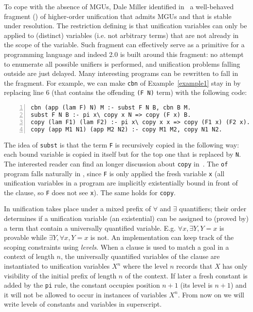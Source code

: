 \documentclass{llncs}
\begin{document}
To cope with the absence of MGUs, Dale Miller identified
in~\cite{Miller91alogic} a well-behaved fragment (\Ll{}) of higher-order
unification that admits MGUs and that is stable under \lp{} resolution. 
The restriction defining \Ll{} is that unification variables can
only be applied to (distinct) variables (i.e. not arbitrary terms) that are
not already in the scope of the variable.
Such fragment can effectively serve as a primitive for a
programming language and indeed \tedius{} 2.0 is built around this fragment:
no attempt to enumerate all possible unifiers is performed, and unification
problems falling outside \Ll{} are just delayed. Many interesting \lp{}
programs can be rewritten to fall in the fragment. For example, we can
make \verb+cbn+ of Example~\ref{example1} stay in \Ll{} by replacing
line 6 (that contains the offending \verb+(F N)+ term) with the following code:
\vspace{-0.4em}
\begin{center}
\small
\begin{minipage}{10cm}
\begin{Verbatim}[numbers=left,numbersep=1pt,frame=leftline]
cbn (app (lam F) N) M :- subst F N B, cbn B M.
subst F N B :- pi x\ copy x N => copy (F x) B.
copy (lam F1) (lam F2) :- pi x\ copy x x => copy (F1 x) (F2 x).
copy (app M1 N1) (app M2 N2) :- copy M1 M2, copy N1 N2.
\end{Verbatim}
\end{minipage}
\end{center}
\vspace{-0.3em}
The idea of \verb+subst+ is that the term \verb+F+ is recursively copied in
the following way: each bound variable is copied in itself but for the top one
that is replaced by \verb+N+.
The interested reader can find an longer discussion about \verb+copy+
in~\cite[page 199]{Miller:2012:PHL:2331097}.
The \verb+of+ program falls naturally in \Ll{}, since \verb+F+ is only applied
the fresh variable \verb+x+ (all unification variables in a \lp{} program are
implicitly existentially bound in front of the clause, so \verb+F+ does not
see \verb+x+). The same holds for \verb+copy+.

In \lp{} unification takes place under
a mixed prefix of $\forall$ and $\exists$ quantifiers; their order
determines if a unification variable (an existential) can be assigned to
(proved by) a term that contain a universally quantified variable.
E.g. $\forall x,\exists Y, Y = x$ is provable while
$\exists Y,\forall x, Y = x$ is not. An implementation can
keep track of the scoping constraints using \emph{levels}.
When a clause is used to match a goal in a context of length
$n$, the universally quantified variables of the clause are instantiated to
unification variables $X^n$ where the level $n$ records that $X$ has only
visibility of the initial prefix of length $n$ of the context.
If later a fresh constant is added by the \verb+pi+ rule, the constant
occupies position $n+1$ (its level is $n+1$) and it will not be allowed to
occur in instances of variables $X^n$.
From now on we will write levels of constants and variables in superscript.
\end{document}
